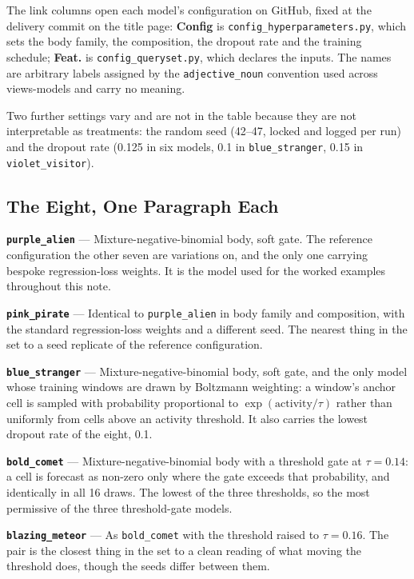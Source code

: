 \noindent The link columns open each model's configuration on GitHub, fixed at the delivery commit
on the title page: \textbf{Config} is \texttt{config\_hyperparameters.py}, which sets the body
family, the composition, the dropout rate and the training schedule; \textbf{Feat.} is
\texttt{config\_queryset.py}, which declares the inputs. The names are arbitrary labels assigned
by the \texttt{adjective\_noun} convention used across views-models and carry no meaning.

Two further settings vary and are not in the table because they are not interpretable as
treatments: the random seed (42--47, locked and logged per run) and the dropout rate (0.125 in six
models, 0.1 in \texttt{blue\_stranger}, 0.15 in \texttt{violet\_visitor}).

\subsection*{The Eight, One Paragraph Each}

\noindent\textbf{\texttt{purple\_alien}} --- Mixture-negative-binomial body, soft gate. The
reference configuration the other seven are variations on, and the only one carrying bespoke
regression-loss weights. It is the model used for the worked examples throughout this note.

\noindent\textbf{\texttt{pink\_pirate}} --- Identical to \texttt{purple\_alien} in body family and
composition, with the standard regression-loss weights and a different seed. The nearest thing in
the set to a seed replicate of the reference configuration.

\noindent\textbf{\texttt{blue\_stranger}} --- Mixture-negative-binomial body, soft gate, and the
only model whose training windows are drawn by Boltzmann weighting: a window's anchor cell is
sampled with probability proportional to $\exp(\text{activity}/\tau)$ rather than uniformly from
cells above an activity threshold. It also carries the lowest dropout rate of the eight, 0.1.

\noindent\textbf{\texttt{bold\_comet}} --- Mixture-negative-binomial body with a threshold gate at
$\tau = 0.14$: a cell is forecast as non-zero only where the gate exceeds that probability, and
identically in all 16 draws. The lowest of the three thresholds, so the most permissive of the
three threshold-gate models.

\noindent\textbf{\texttt{blazing\_meteor}} --- As \texttt{bold\_comet} with the threshold raised to
$\tau = 0.16$. The pair is the closest thing in the set to a clean reading of what moving the
threshold does, though the seeds differ between them.

